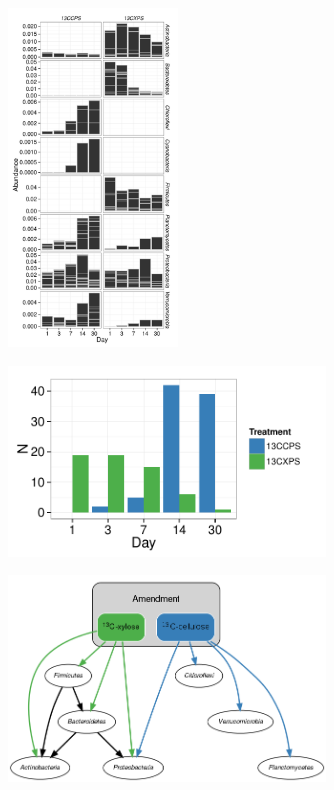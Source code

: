 \begin{figure}[H]
	\begin{center}
	\centerline{\includegraphics[width=0.40\textwidth]{figures/bulk_phylum_rspndr_abund/bulk_phylum_rspndr_abund.pdf}}
	\caption{\protect}\label{fig:babund}
        \end{center}
\end{figure}


\begin{figure}[H]
	\begin{center}
	\centerline{\includegraphics[width=0.75\textwidth]{figures/all_rspndr_bar/all_rspndr_bar.pdf}}
	\caption{\protect}\label{fig:rspndr_count}
        \end{center}
\end{figure}

\begin{figure}[H]
	\begin{center}
    \centerline{\includegraphics[width=0.75\textwidth]{figures/foodweb/foodweb.png}}
    \caption{\protect}\label{fig:foodweb}
    \end{center} \end{figure}



